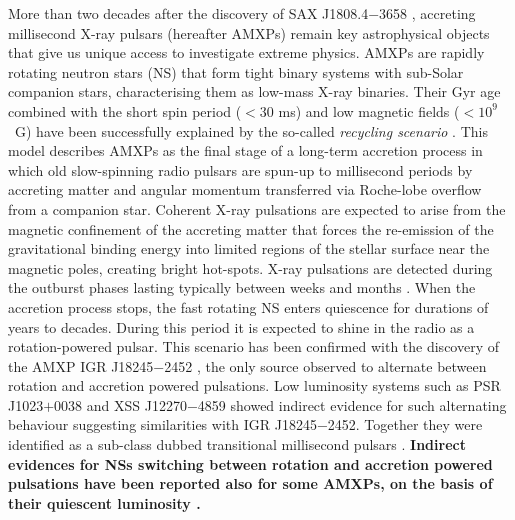 \documentclass[fleqn,usenatbib]{mnras}
\begin{document}
More than two decades after the discovery of SAX J1808.4$-$3658 \citep{Wijnands:1998vk}, accreting millisecond X-ray pulsars (hereafter AMXPs) remain key astrophysical objects that give us unique access to investigate extreme physics. AMXPs are rapidly rotating neutron stars (NS) that form tight binary systems with sub-Solar companion stars, characterising them as low-mass X-ray binaries. Their Gyr age combined with the short spin period ($<30$ ms) and low magnetic fields ($<10^9$~G) have been successfully explained by the so-called \textit{recycling scenario} \citep[see e.g.,][]{Alpar:1982wh,Bhattacharya91}. This model describes AMXPs as the final stage of a long-term accretion process in which old slow-spinning radio pulsars are spun-up to millisecond periods by accreting matter and angular momentum transferred via Roche-lobe overflow from a companion star. Coherent X-ray pulsations are expected to arise from the magnetic confinement of the accreting matter that forces the re-emission of the gravitational binding energy into limited regions of the stellar surface near the magnetic poles, creating bright hot-spots.  
X-ray pulsations are detected during the outburst phases lasting typically between weeks and months \citep[see e.g.,][for reviews]{Di-Salvo:2020va,Patruno:2021vs}.
When the accretion process stops, the fast rotating NS enters quiescence for durations of years to decades. During this period it is expected to shine in the radio as a rotation-powered pulsar. This scenario has been confirmed with the discovery of the AMXP IGR J18245$-$2452 \citep{Papitto:2013uf}, the only source observed to alternate between rotation and accretion powered pulsations. Low luminosity systems such as PSR J1023$+$0038 \citep[see e.g.,][]{Stappers:2014wn,Archibald:2015vw} and XSS J12270$-$4859 \citep[see e.g.,][]{Bassa:2014uu,Papitto:2015wo} showed indirect evidence for such alternating behaviour suggesting similarities with IGR J18245$-$2452. Together they were identified as a sub-class dubbed transitional millisecond pulsars \citep[see][for a review]{Papitto:2020wl}. \textbf{Indirect evidences for NSs switching between rotation and accretion powered pulsations have been reported also for some AMXPs, on the basis of their quiescent luminosity \citep[see e.g.,][]{Burderi:2003wk,Campana:2004vf,DAvanzo:2009vs}.
}
\end{document}
